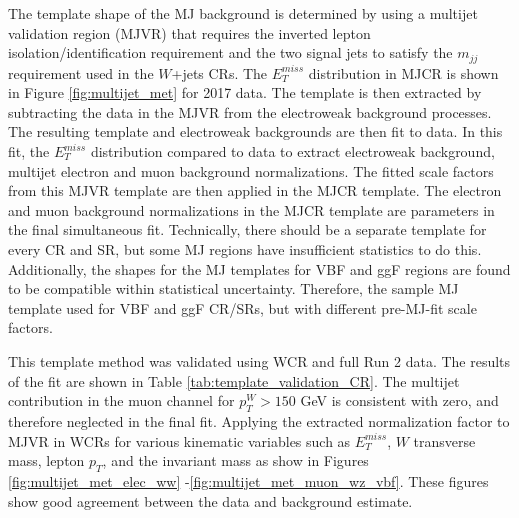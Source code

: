 The template shape of the MJ background is determined by using a multijet validation region (MJVR) that requires the inverted lepton isolation/identification requirement and the two signal jets to satisfy the $m_{jj}$ requirement used in the $W$+jets CRs. The $E_{T}^{miss}$ distribution in MJCR is shown in Figure \ref{fig:multijet_met} for 2017 data. The template is then extracted by subtracting the data in the MJVR from the electroweak background processes. The resulting template and electroweak backgrounds are then fit to data. In this fit, the $E_{T}^{miss}$ distribution compared to data to extract electroweak background, multijet electron and muon background normalizations.  The fitted scale factors from this MJVR template are then applied in the MJCR template. The electron and muon background normalizations in the MJCR template are parameters in the final simultaneous fit. Technically, there should be a separate template for every CR and SR, but some MJ regions have insufficient statistics to do this. Additionally, the shapes for the MJ templates for VBF and ggF regions are found to be compatible within statistical uncertainty. Therefore, the sample MJ template used for VBF and ggF CR/SRs, but with different pre-MJ-fit scale factors. 

This template method was validated using WCR and full Run 2 data. The results of the fit are shown in Table \ref{tab:template_validation_CR}. The multijet contribution in the muon channel for $p_{T}^{W} > 150$ GeV is consistent with zero, and therefore neglected in the final fit. Applying the extracted normalization factor to MJVR in WCRs for various kinematic variables such as $E_{T}^{miss}$, $W$ transverse mass, lepton $p_{T}$, and the invariant mass as show in Figures \ref{fig:multijet_met_elec_ww} -\ref{fig:multijet_met_muon_wz_vbf}. These figures show good agreement between the data and background estimate.

